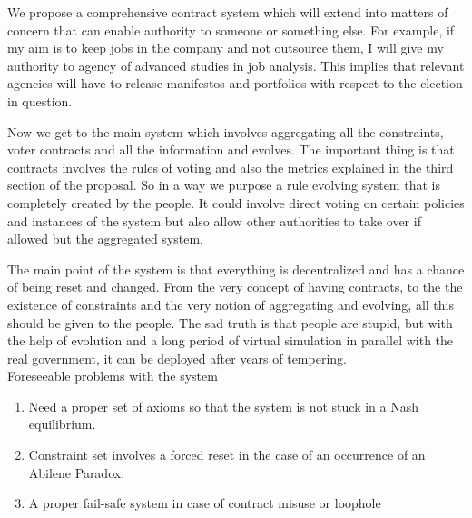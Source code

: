 \documentclass[a4paper]{article}
\begin{document}
We propose a comprehensive contract system which will extend into matters of concern that can enable authority to someone or something else. For example, if my aim is to keep jobs in the company and not outsource them, I will give my authority to agency of advanced studies in job analysis. This implies that relevant agencies will have to release manifestos and portfolios with respect to the election in question.

Now we get to the main system which involves aggregating all the constraints, voter contracts and all the information and evolves. The important thing is that contracts involves the rules of voting and also the metrics explained in the third section of the proposal. So in a way we purpose a rule evolving system that is completely created by the people. It could involve direct voting on certain policies and instances of the system but also allow other authorities to take over if allowed but the aggregated system. 

The main point of the system is that everything is decentralized and has a chance of being reset and changed. From the very concept of having contracts, to the the existence of constraints and the very notion of aggregating and evolving, all this should be given to the people. The sad truth is that people are stupid, but with the help of evolution and a long period of virtual simulation in parallel with the real government, it can be deployed after years of tempering. \\
Foreseeable problems with the system
\begin{enumerate}
\item Need a proper set of axioms so that the system is not stuck in a Nash equilibrium. 
\item Constraint set involves a forced reset in the case of an occurrence of an Abilene Paradox.
\item A proper fail-safe system in case of contract misuse or loophole
\end{enumerate}



\cite{saari}
\cite{chomsky}
\cite{duverger}
\end{document}
